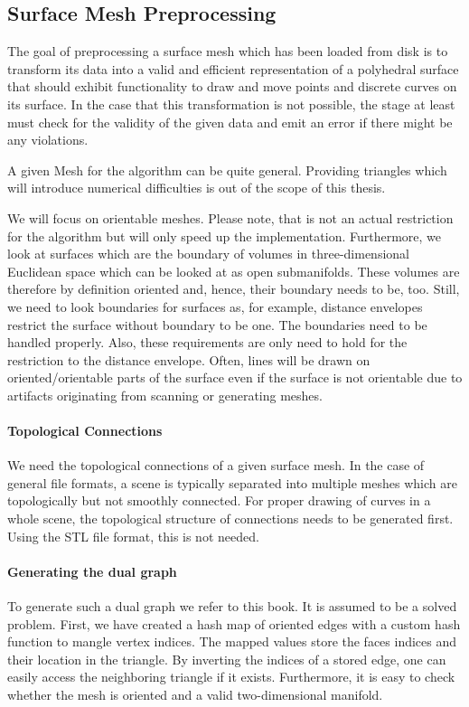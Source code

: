 \documentclass{stdlocal}
\begin{document}
\subsection{Surface Mesh Preprocessing} %
\label{sub:mesh_preprocessing}
  The goal of preprocessing a surface mesh which has been loaded from disk is to transform its data into a valid and efficient representation of a polyhedral surface that should exhibit functionality to draw and move points and discrete curves on its surface.
  In the case that this transformation is not possible, the stage at least must check for the validity of the given data and emit an error if there might be any violations.

  A given Mesh for the algorithm can be quite general.
  Providing triangles which will introduce numerical difficulties is out of the scope of this thesis.

  We will focus on orientable meshes.
  Please note, that is not an actual restriction for the algorithm but will only speed up the implementation.
  Furthermore, we look at surfaces which are the boundary of volumes in three-dimensional Euclidean space which can be looked at as open submanifolds.
  These volumes are therefore by definition oriented and, hence, their boundary needs to be, too.
  Still, we need to look boundaries for surfaces as, for example, distance envelopes restrict the surface without boundary to be one.
  The boundaries need to be handled properly.
  Also, these requirements are only need to hold for the restriction to the distance envelope.
  Often, lines will be drawn on oriented/orientable parts of the surface even if the surface is not orientable due to artifacts originating from scanning or generating meshes.

  \paragraph{Topological Connections}
  We need the topological connections of a given surface mesh.
  In the case of general file formats, a scene is typically separated into multiple meshes which are topologically but not smoothly connected.
  For proper drawing of curves in a whole scene, the topological structure of connections needs to be generated first.
  Using the STL file format, this is not needed.

  \paragraph{Generating the dual graph}
   To generate such a dual graph we refer to this book.
  It is assumed to be a solved problem.
  First, we have created a hash map of oriented edges with a custom hash function to mangle vertex indices.
  The mapped values store the faces indices and their location in the triangle.
  By inverting the indices of a stored edge, one can easily access the neighboring triangle if it exists.
  Furthermore, it is easy to check whether the mesh is oriented and a valid two-dimensional manifold.
\end{document}
